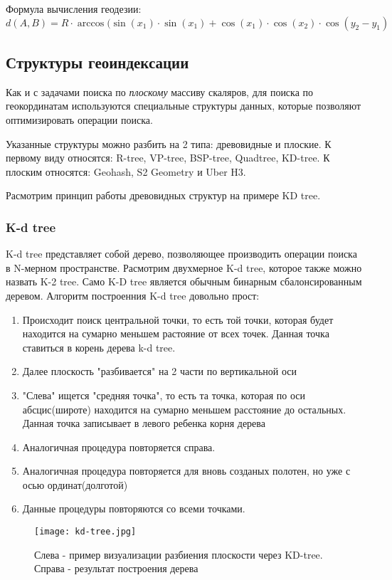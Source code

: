 Формула вычисления геодезии:
$$
d(A, B) = R \cdot \arccos(\sin(x_1) \cdot \sin(x_1) + \cos(x_1) \cdot \cos(x_2) \cdot \cos(y_2 - y_1)
$$

\subsection{Структуры геоиндексации}
Как и с задачами поиска по \textit{плоскому} массиву скаляров, для поиска по геокординатам используются специальные структуры данных, которые позволяют оптимизировать операции поиска.

Указанные структуры можно разбить на 2 типа: древовидные и плоские. К первому виду относятся: R-tree, VP-tree, BSP-tree, Quadtree, KD-tree. К плоским относятся: Geohash, S2 Geometry и Uber H3.

Расмотрим принцип работы древовидных структур на примере KD tree.

\subsubsection{K-d tree}
K-d tree представляет собой дерево, позволяющее производить операции поиска в N-мерном пространстве. Расмотрим двухмерное K-d tree, которое также можно назвать K-2 tree.
Само K-D tree является обычным бинарным сбалонсированным деревом.
Алгоритм построенния K-d tree довольно прост:
\begin{enumerate}
    \item Происходит поиск центральной точки, то есть той точки, которая будет находится на сумарно меньшем растояние от всех точек. Данная точка ставиться в корень дерева k-d tree.
    \item Далее плоскость "разбивается" на 2 части по вертикальной оси
    \item "Слева" ищется "средняя точка", то есть та точка, которая по оси абсцис(широте) находится на сумарно меньшем расстояние до остальных. Данная точка записывает в левого ребенка корня дерева
    \item Аналогичная процедура повторяется справа.
    \item Аналогичная процедура повторяется для вновь созданых полотен, но уже с осью ординат(долготой)
    \item Данные процедуры повторяются со всеми точками.
\end{enumerate}

\begin{figure}[h]
    \centering
    \texttt{[image: kd-tree.jpg]}
    \caption{Слева - пример визуализации разбиения плоскости через KD-tree. Справа - результат построения дерева}
\end{figure}

